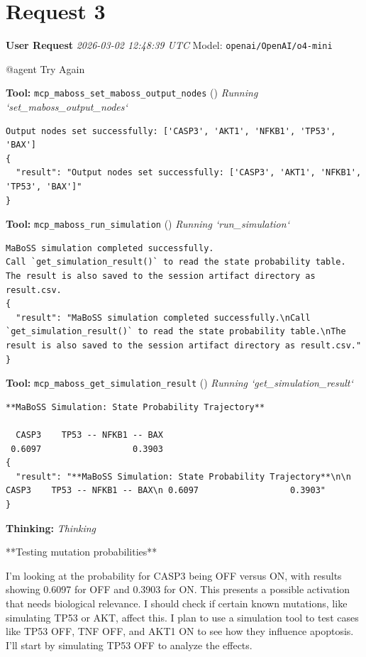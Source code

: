 \documentclass[11pt,a4paper]{article}
\begin{document}
\section{Request 3}
\begin{userbox}
\textbf{User Request}
\quad \textit{2026-03-02 12:48:39 UTC}
\quad Model: \texttt{openai/OpenAI/o4-mini}

@agent Try Again

\end{userbox}
\begin{toolokbox}
\textbf{Tool:} \texttt{mcp\_maboss\_set\_maboss\_output\_nodes} (\checkmark)
\textit{Running `set\_maboss\_output\_nodes`}
\begin{lstlisting}
Output nodes set successfully: ['CASP3', 'AKT1', 'NFKB1', 'TP53', 'BAX']
{
  "result": "Output nodes set successfully: ['CASP3', 'AKT1', 'NFKB1', 'TP53', 'BAX']"
}
\end{lstlisting}
\end{toolokbox}
\begin{toolokbox}
\textbf{Tool:} \texttt{mcp\_maboss\_run\_simulation} (\checkmark)
\textit{Running `run\_simulation`}
\begin{lstlisting}
MaBoSS simulation completed successfully.
Call `get_simulation_result()` to read the state probability table.
The result is also saved to the session artifact directory as result.csv.
{
  "result": "MaBoSS simulation completed successfully.\nCall `get_simulation_result()` to read the state probability table.\nThe result is also saved to the session artifact directory as result.csv."
}
\end{lstlisting}
\end{toolokbox}
\begin{toolokbox}
\textbf{Tool:} \texttt{mcp\_maboss\_get\_simulation\_result} (\checkmark)
\textit{Running `get\_simulation\_result`}
\begin{lstlisting}
**MaBoSS Simulation: State Probability Trajectory**

  CASP3    TP53 -- NFKB1 -- BAX
 0.6097                  0.3903
{
  "result": "**MaBoSS Simulation: State Probability Trajectory**\n\n  CASP3    TP53 -- NFKB1 -- BAX\n 0.6097                  0.3903"
}
\end{lstlisting}
\end{toolokbox}
\begin{thinkbox}
\textbf{Thinking:} \textit{Thinking}

**Testing mutation probabilities**

I'm looking at the probability for CASP3 being OFF versus ON, with results showing 0.6097 for OFF and 0.3903 for ON. This presents a possible activation that needs biological relevance. I should check if certain known mutations, like simulating TP53 or AKT, affect this. I plan to use a simulation tool to test cases like TP53 OFF, TNF OFF, and AKT1 ON to see how they influence apoptosis. I'll start by simulating TP53 OFF to analyze the effects.

\end{thinkbox}
\end{document}
